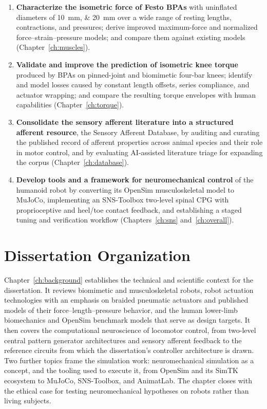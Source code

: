 \begin{enumerate}
    \item \textbf{Characterize the isometric force of Festo BPAs} with uninflated diameters of \qtylist{10;20}{\mm} over a wide range of resting lengths, contractions, and pressures; derive improved maximum-force and normalized force--strain--pressure models; and compare them against existing models (Chapter~\ref{ch:muscles}).
    \item \textbf{Validate and improve the prediction of isometric knee torque} produced by BPAs on pinned-joint and biomimetic four-bar knees; identify and model losses caused by constant length offsets, series compliance, and actuator wrapping; and compare the resulting torque envelopes with human capabilities (Chapter~\ref{ch:torque}).
    \item \textbf{Consolidate the sensory afferent literature into a structured afferent resource}, the Sensory Afferent Database, by auditing and curating the published record of afferent properties across animal species and their role in motor control, and by evaluating AI-assisted literature triage for expanding the corpus (Chapter~\ref{ch:database}).
    \item \textbf{Develop tools and a framework for neuromechanical control} of the humanoid robot by converting its OpenSim musculoskeletal model to MuJoCo, implementing an SNS-Toolbox two-level spinal CPG with proprioceptive and heel/toe contact feedback, and establishing a staged tuning and verification workflow (Chapters~\ref{ch:sns} and~\ref{ch:overall}).
\end{enumerate}

\section{Dissertation Organization}\label{sec:organization}

Chapter~\ref{ch:background} establishes the technical and scientific context for the dissertation. It reviews biomimetic and musculoskeletal robots, robot actuation technologies with an emphasis on braided pneumatic actuators and published models of their force--length--pressure behavior, and the human lower-limb biomechanics and OpenSim benchmark models that serve as design targets. It then covers the computational neuroscience of locomotor control, from two-level central pattern generator architectures and sensory afferent feedback to the reference circuits from which the dissertation's controller architecture is drawn. Two further topics frame the simulation work: neuromechanical simulation as a concept, and the tooling used to execute it, from OpenSim and its SimTK ecosystem to MuJoCo, SNS-Toolbox, and AnimatLab. The chapter closes with the ethical case for testing neuromechanical hypotheses on robots rather than living subjects.

